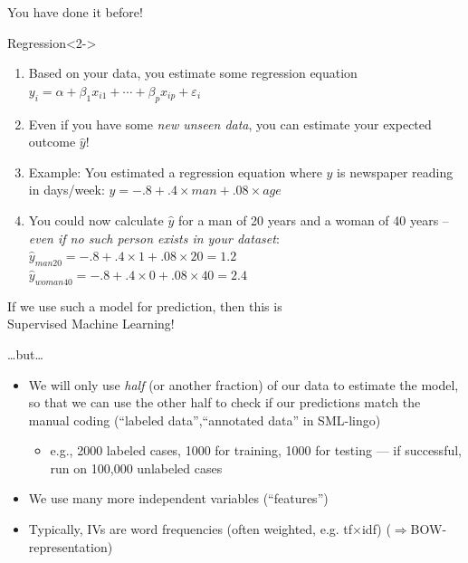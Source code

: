 \documentclass{beamer}
\begin{document}
\begin{frame}{You have done it before!}
\begin{block}{Regression}<2->
	\begin{enumerate}
		\item<3-> Based on your data, you estimate some regression equation 	$y_i = \alpha + \beta_1 x_{i1} + \cdots + \beta_p x_{ip} + \varepsilon_i$
		\item<4-> Even if you have some \emph{new unseen data}, you can estimate your expected outcome $\hat{y}$!
		\item<5-> Example: You estimated a regression equation where $y$ is newspaper reading in days/week: $y = -.8 + .4 \times man + .08 \times age$
		\item<6-> You could now calculate $\hat{y}$ for a man of 20 years and a woman of 40 years -- \emph{even if no such person exists in your dataset}: \\
		$\hat{y}_{man20} = -.8 + .4 \times 1 + .08 \times 20 = 1.2$ \\
		$\hat{y}_{woman40} = -.8 + .4 \times 0 + .08 \times 40 = 2.4$
	\end{enumerate}
\end{block}	

\end{frame}


\begin{frame}{}
	If we use such a model for prediction, then
	\huge{this is\\ Supervised Machine Learning!}
\end{frame}

\begin{frame}{\ldots but\ldots}
	\begin{itemize}
		\item<1-> We will only use \emph{half} {\tiny{(or another fraction)}} of our data to estimate the model, so that we can use the other half to check if our predictions match the manual coding (``labeled data'',``annotated data'' in SML-lingo)
		\begin{itemize}
			\item<2->e.g., 2000 labeled cases, 1000 for training, 1000 for testing --- if successful, run on 100,000 unlabeled cases
		\end{itemize}
		\item<3-> We use many more independent variables (``features'')
		\item<4-> Typically, IVs are word frequencies (often weighted, e.g. tf$\times$idf) ($\Rightarrow$BOW-representation)
	\end{itemize}
\end{frame}
\end{document}
